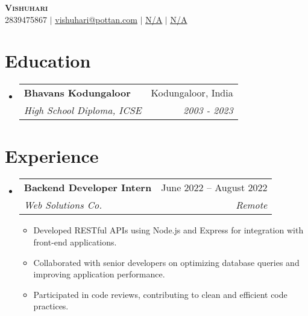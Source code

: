 \documentclass[letterpaper,11pt]{article}
\makeatletter
\newcommand{\resumeItem}[1]{
  \item\small{
    {#1 \vspace{-2pt}}
  }
}
\newcommand{\resumeSubheading}[4]{
  \vspace{-2pt}\item
    \begin{tabular*}{0.97\textwidth}[t]{l@{\extracolsep{\fill}}r}
      \textbf{#1} & #2 \\
      \textit{\small#3} & \textit{\small #4} \\
    \end{tabular*}\vspace{-7pt}
}
\newcommand{\resumeSubHeadingListStart}{\begin{itemize}[leftmargin=0.15in, label={}]}
\newcommand{\resumeSubHeadingListEnd}{\end{itemize}}
\newcommand{\resumeItemListStart}{\begin{itemize}}
\newcommand{\resumeItemListEnd}{\end{itemize}\vspace{-5pt}}
\makeatother
\begin{document}

\begin{center}
    \textbf{\Huge \scshape Vishuhari} \\ \vspace{1pt}
    \small 2839475867 $|$ \href{mailto:vishuhari@pottan.com}{\underline{vishuhari@pottan.com}} $|$ 
    \href{N/A}{\underline{N/A}} $|$
    \href{N/A}{\underline{N/A}}
\end{center}

\section{Education}
  \resumeSubHeadingListStart

    \resumeSubheading
      {Bhavans Kodungaloor}{Kodungaloor, India}
      {High School Diploma, ICSE}{2003 - 2023}

  \resumeSubHeadingListEnd

\section{Experience}
  \resumeSubHeadingListStart

    \resumeSubheading
      {Backend Developer Intern}{June 2022 – August 2022}
      {Web Solutions Co.}{Remote}
      \resumeItemListStart

        \resumeItem{Developed RESTful APIs using Node.js and Express for integration with front-end applications.}

        \resumeItem{Collaborated with senior developers on optimizing database queries and improving application performance.}

        \resumeItem{Participated in code reviews, contributing to clean and efficient code practices.}

    \resumeItemListEnd

  \resumeSubHeadingListEnd

\end{document}
